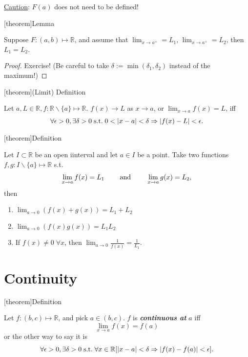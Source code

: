 \documentclass[12pt]{report}
\theoremstyle{definition}
\begin{document}
\underline{Caution}: $F(a)$ does not need to be defined!

[theorem]{Lemma}
\begin{left and right limit are equal}
    Suppose $F:(a,b) \mapsto \mathbb{R}$, and assume that $\lim_{x \rightarrow{}a^{+}} = L_1$,
    $\lim_{x \rightarrow{}a^{+}} = L_2$, then $L_1 = L_2$.
\end{left and right limit are equal}

\begin{proof}
    Exercise! (Be careful to take $\delta := \min{(\delta_1, \delta_2)}$
    instead of the maximum!)
\end{proof}

[theorem]{(Limit) Definition}
\begin{limit definition}
    Let $a,L \in\mathbb{R}, f:\mathbb{R}\backslash\{a\}\mapsto\mathbb{R}$.
    $f(x)\rightarrow{}L$ as $x\rightarrow{}a$,
    or $\lim_{x\rightarrow{}a}f(x) = L$, iff\[
        \forall \epsilon>0, \exists \delta>0 \;\textnormal{s.t.}\;
        0<|x-a|<\delta \Rightarrow{}|f(x)-L|<\epsilon.
    \]
\end{limit definition}

[theorem]{Definition}
\begin{Algebra of limits}
    Let $I\subset \mathbb{R}$ be an open iinterval and let $a\in I$ be a point.
    Take two functions $f,g:I\backslash\{a\}\mapsto\mathbb{R}$ s.t.\[
        \lim_{x\rightarrow{}a} f(x) = L_1 \qquad\;\textnormal{and}\;\qquad
        \lim_{x\to a} g(x) = L_2,
    \]then
    \begin{enumerate}
        \item $\lim_{a\to 0}(f(x)+g(x)) = L_1 + L_2$
        \item $\lim_{a\rightarrow{}0}(f(x)g(x)) = L_1L_2$
        \item If $f(x)\neq 0 \;\forall x$, then $\lim_{a\to{}0}\frac{1}{f(x)}=\frac{1}{L_1}$.
    \end{enumerate}
\end{Algebra of limits}

\section{Continuity}

[theorem]{Definition}
\begin{continuous at a}
    Let $f:(b,c)\mapsto\mathbb{R}$, and pick $a\in(b,c)$.
    $f$ is \textbf{\emph{continuous at}} $a$ iff\[
        \lim_{x\rightarrow{}a}f(x) = f(a)
    \]or the other way to say it is\[
        \forall \epsilon>0, \exists \delta>0 \;\textnormal{s.t.}\;
        \forall x\in\mathbb{R}[|x-a|<\delta \Rightarrow{}|f(x) - f(a)|<\epsilon].
    \]
\end{continuous at a}
\end{document}
